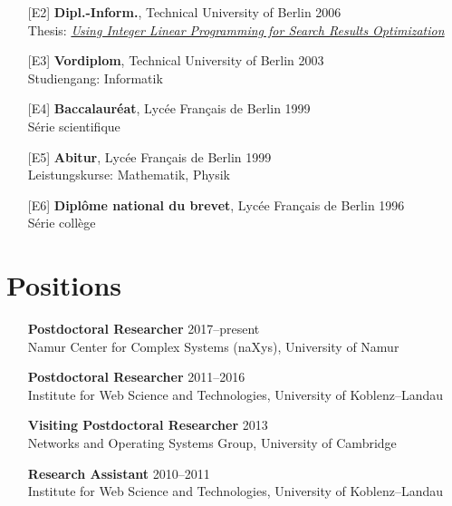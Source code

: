 \documentclass[line,mm]{res}
\newcounter{x}
\newcounter{y}
\begin{document}
\begin{resume}
\begin{itemize}
\item[{[E2]}]
\textbf{Dipl.-Inform.}, Technical University of Berlin \hfill 2006 \\
Thesis: \emph{\href{https://pdfs.semanticscholar.org/42ca/e9b00864ee09bc9bc92ef3d411e20b966a8d.pdf}{Using Integer Linear Programming for Search Results Optimization}}

\item[{[E3]}]
\textbf{Vordiplom}, Technical University of Berlin \hfill 2003 \\
Studiengang:  Informatik

\item[{[E4]}]
\textbf{Baccalauréat}, Lycée Français de Berlin \hfill 1999 \\
Série scientifique

\item[{[E5]}]
\textbf{Abitur}, Lycée Français de Berlin \hfill 1999 \\
Leistungskurse:  Mathematik, Physik 

\item[{[E6]}]
\textbf{Diplôme national du brevet}, Lycée Français de Berlin \hfill 1996 \\
Série collège

\end{itemize}

\section{Positions}

\begin{itemize}

\item[]
\textbf{Postdoctoral Researcher} \hfill 2017--present \\
Namur Center for Complex Systems (naXys), University of Namur 

\item[]
\textbf{Postdoctoral Researcher} \hfill 2011--2016 \\
Institute for Web Science and Technologies, University of Koblenz--Landau 

\item[]
\textbf{Visiting Postdoctoral Researcher} \hfill 2013 \\
Networks and Operating Systems Group, University of Cambridge

\item[]
\textbf{Research Assistant} \hfill 2010--2011 \\
Institute for Web Science and Technologies, University of Koblenz--Landau 


\end{itemize}
\end{resume}
\end{document}
